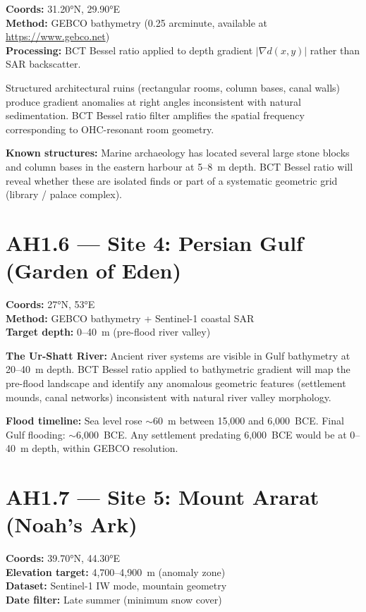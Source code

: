 \documentclass[12pt,twocolumn]{article}
\begin{document}
\textbf{Coords:} 31.20°N, 29.90°E\\
\textbf{Method:} GEBCO bathymetry (0.25 arcminute,
available at \url{https://www.gebco.net})\\
\textbf{Processing:} BCT Bessel ratio applied to depth
gradient $|\nabla d(x,y)|$ rather than SAR backscatter.

Structured architectural ruins (rectangular rooms, column
bases, canal walls) produce gradient anomalies at right
angles inconsistent with natural sedimentation. BCT Bessel
ratio filter amplifies the spatial frequency corresponding
to OHC-resonant room geometry.

\textbf{Known structures:} Marine archaeology has located
several large stone blocks and column bases in the eastern
harbour at 5--8~m depth. BCT Bessel ratio will reveal
whether these are isolated finds or part of a systematic
geometric grid (library / palace complex).

\section{AH1.6 --- Site 4: Persian Gulf (Garden of Eden)}

\textbf{Coords:} 27°N, 53°E\\
\textbf{Method:} GEBCO bathymetry + Sentinel-1 coastal SAR\\
\textbf{Target depth:} 0--40~m (pre-flood river valley)

\textbf{The Ur-Shatt River:} Ancient river systems are
visible in Gulf bathymetry at 20--40~m depth. BCT Bessel
ratio applied to bathymetric gradient will map the
pre-flood landscape and identify any anomalous geometric
features (settlement mounds, canal networks) inconsistent
with natural river valley morphology.

\textbf{Flood timeline:} Sea level rose $\sim$60~m between
15,000 and 6,000~BCE. Final Gulf flooding: $\sim$6,000~BCE.
Any settlement predating 6,000~BCE would be at 0--40~m
depth, within GEBCO resolution.

\section{AH1.7 --- Site 5: Mount Ararat (Noah's Ark)}

\textbf{Coords:} 39.70°N, 44.30°E\\
\textbf{Elevation target:} 4,700--4,900~m (anomaly zone)\\
\textbf{Dataset:} Sentinel-1 IW mode, mountain geometry\\
\textbf{Date filter:} Late summer (minimum snow cover)
\end{document}
